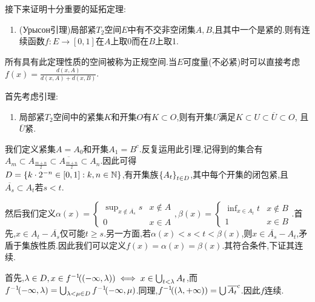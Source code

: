\documentclass{article}
\begin{document}
接下来证明十分重要的延拓定理:\begin{enumerate}[resume]
    \item (Урысон引理)局部紧$T_2$空间$E$中有不交非空闭集$A,B$,且其中一个是紧的.则有连续函数$f:E\to [0,1]$在$A$上取0而在$B$上取1.
\end{enumerate}

所有具有此定理性质的空间被称为正规空间.当$E$可度量(不必紧)时可以直接考虑$f(x)=\frac{d(x,A)}{d(x,A)+d(x,B)}$.

首先考虑引理:\begin{enumerate}[resume]
    \item 局部紧$T_2$空间中的紧集$K$和开集$O$有$K\subset O$,则有开集$U$满足$K\subset U\subset \overline{U}\subset O$, 且$\overline{U}$紧.\\
\end{enumerate}

我们定义紧集$A=A_0$和开集$A_1=B^c$.反复运用此引理,记得到的集合有$A_{m}\subset A_{\frac{m+n}{2}}\subset \overline{A_{\frac{m+n}{2}}}\subset A_n$.因此可得\\$D=\left\{k\cdot 2^{-n}\in [0,1]:k,n\in \mathbb{N}\right\}$,有开集族$\left\{A_t\right\}_{t\in D}$,其中每个开集的闭包紧,且$\overline{A_s}\subset A_t$若$s<t$.

然后我们定义$\alpha(x)=\begin{cases}
    \sup_{x\notin \overline{A_s}}s&x\notin A\\ 0&x\in A
\end{cases}, \beta(x)=\begin{cases}
    \inf_{x\in A_t}t& x\notin B\\ 1&x\in B
\end{cases}$.首先,$x\in A_t-\overline{A_s}$仅可能$t\geq s$.另一方面,若$\alpha(x)<s<t<\beta(x)$,则$x\in \overline{A_s}-A_t$,矛盾于集族性质.因此我们可以定义$\!f(x)=\alpha(x)=\beta(x)$.\!其符合条件,\!下证其连续.

首先,$\lambda\in D, x\in f^{-1}\!((-\infty,\lambda))\iff x\in \bigcup_{t<\lambda}A_t$,而$f^{-1}\!(-\infty,\lambda)=\bigcup_{\lambda<\mu\in D} f^{-1}\!(-\infty,\mu)$.同理,$f^{-1}\!((\lambda,+\infty))=\bigcup \overline{A_t}^c$.因此$f$连续.
\end{document}
